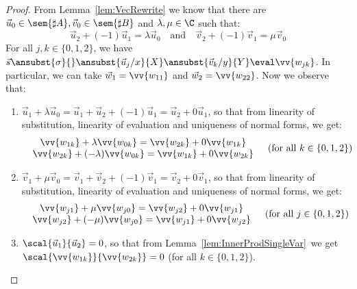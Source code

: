 \begin{proof}
    From Lemma~\ref{lem:VecRewrite} we know that there are $\vec{u}_{0}\in\sem{\sharp A}, \vec{v}_{0}\in\sem{\sharp B}$ and $\lambda,\mu\in\C$ such that:
    \[
    \vec{u}_{2} + (-1) \vec{u}_{1} = \lambda\vec{u}_{0}\quad\text{and}\quad\vec{v}_{2} + (-1) \vec{v}_{1} = \mu \vec{v}_{0}
    \]
    For all $j,k\in\{0,1,2\}$, we have $\vec{s}\ansubst{\sigma}{}\ansubst{\vec{u}_{j}/x}{X}\ansubst{\vec{v}_{k}/y}{Y}\eval\vv{w_{jk}}$. In particular, we can take $\vec{w}_{1}=\vv{w_{11}}$ and $\vec{w}_{2}=\vv{w_{22}}$. Now we observe that:
    \begin{enumerate}
        \item\label{A8:it1} $\vec{u}_{1}+\lambda\vec{u}_{0}= \vec{u}_{1} + \vec{u}_{2} + (-1) \vec{u}_{1}= \vec{u}_{2} + 0\vec{u}_{1}$, so that from linearity of substitution, linearity of evaluation and uniqueness of normal forms, we get:
        \[
        \begin{array}{c c}
            \begin{array}{c}
                \vv{w_{1k}} + \lambda\vv{w_{0k}} = \vv{w_{2k}} + 0 \vv{w_{1k}}\\
                \vv{w_{2k}} + (-\lambda)\vv{w_{0k}} = \vv{w_{1k}} + 0 \vv{w_{2k}}
            \end{array}&
            (\text{for all }k\in\{0,1,2\})
        \end{array}
        \]
        
        \item\label{A8:it2} $\vec{v}_{1}+\mu\vec{v}_{0}= \vec{v}_{1} + \vec{v}_{2} + (-1) \vec{v}_{1}= \vec{v}_{2} + 0\vec{v}_{1}$, so that from linearity of substitution, linearity of evaluation and uniqueness of normal forms, we get:
        \[
        \begin{array}{c c}
            \begin{array}{c}
                \vv{w_{j1}} + \mu\vv{w_{j0}} = \vv{w_{j2}} + 0 \vv{w_{j1}}\\
                \vv{w_{j2}} + (-\mu)\vv{w_{j0}} = \vv{w_{j1}} + 0 \vv{w_{j2}}
            \end{array}&
            (\text{for all }j\in\{0,1,2\})
        \end{array}
        \]
        
        \item\label{A8:it3} $\scal{\vec{u}_{1}}{\vec{u}_{2}}=0$, so that from Lemma~\ref{lem:InnerProdSingleVar}~we get $\scal{\vv{w_{1k}}}{\vv{w_{2k}}}=0$ (for all $k\in\{0,1,2\}$).
        

\end{enumerate}
\end{proof}

